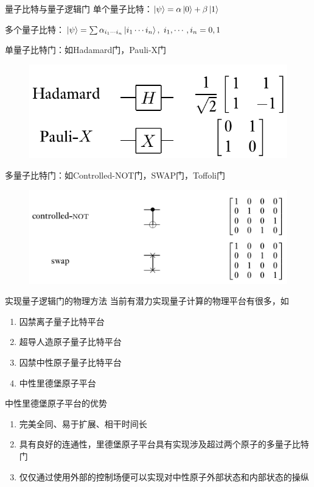 \documentclass[10pt,aspectratio=43]{beamer}
\begin{document}
\begin{frame}{量子比特与量子逻辑门}
单个量子比特：$ \ket{\psi}=\alpha\ket{0}+\beta\ket{1} $

多个量子比特：$ \ket{\psi}=\sum\alpha_{i_1\cdots i_n}\ket{i_1\cdots i_n},~i_1,\cdots,i_n=0,1 $

单量子比特门：如Hadamard门，Pauli-X门
\begin{figure}
\centering
\includegraphics[scale=0.25]{figures/gate1}
\label{fig:gate1}
\end{figure}

多量子比特门：如Controlled-NOT门，SWAP门，Toffoli门
\begin{figure}
\centering
\includegraphics[scale=0.25]{figures/gaten}
\label{fig:gaten}
\end{figure}
\end{frame}

\begin{frame}{实现量子逻辑门的物理方法}
当前有潜力实现量子计算的物理平台有很多，如
\begin{enumerate}
\item 囚禁离子量子比特平台
\item 超导人造原子量子比特平台
\item 囚禁中性原子量子比特平台
\item 中性里德堡原子平台
\end{enumerate}
中性里德堡原子平台的优势
\begin{enumerate}
\item 完美全同、易于扩展、相干时间长
\item 具有良好的连通性，里德堡原子平台具有实现涉及超过两个原子的多量子比特门
\item 仅仅通过使用外部的控制场便可以实现对中性原子外部状态和内部状态的操纵
\end{enumerate}
\end{frame}
\end{document}
